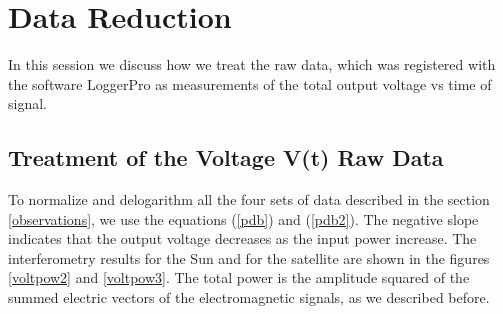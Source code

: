 \section{Data Reduction}

In this session we discuss how we treat the raw data, which was registered with the  software LoggerPro \cite{loggerpro} as measurements of the total output voltage vs time of  signal.

\subsection{Treatment of the Voltage V(t) Raw Data}

To normalize and delogarithm  all the four sets of data described in the section \ref{observations},  we use the equations (\ref{pdb}) and (\ref{pdb2}). The negative slope indicates that the output voltage decreases as the input power increase. The interferometry results for the Sun and for the satellite are shown in the figures \ref{voltpow2} and \ref{voltpow3}. The total power is the amplitude squared of the summed  electric vectors of the electromagnetic signals, as we described before.




